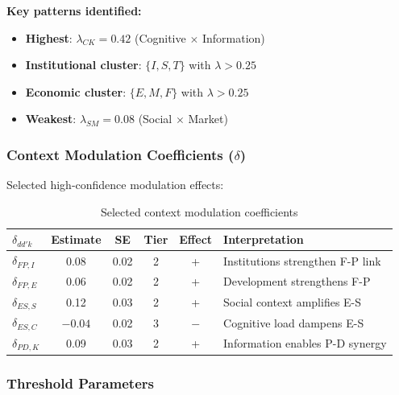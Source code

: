 \textbf{Key patterns identified:}
\begin{itemize}
    \item \textbf{Highest}: $\lambda_{CK} = 0.42$ (Cognitive $\times$ Information)
    \item \textbf{Institutional cluster}: $\{I, S, T\}$ with $\lambda > 0.25$
    \item \textbf{Economic cluster}: $\{E, M, F\}$ with $\lambda > 0.25$
    \item \textbf{Weakest}: $\lambda_{SM} = 0.08$ (Social $\times$ Market)
\end{itemize}

\subsubsection{Context Modulation Coefficients ($\delta$)}

Selected high-confidence modulation effects:

\begin{table}[h]
\centering
\small
\begin{tabular}{lccccl}
\toprule
\textbf{$\delta_{dd'k}$} & \textbf{Estimate} & \textbf{SE} & \textbf{Tier} & \textbf{Effect} & \textbf{Interpretation} \\
\midrule
$\delta_{FP,I}$ & 0.08 & 0.02 & 2 & + & Institutions strengthen F-P link \\
$\delta_{FP,E}$ & 0.06 & 0.02 & 2 & + & Development strengthens F-P \\
$\delta_{ES,S}$ & 0.12 & 0.03 & 2 & + & Social context amplifies E-S \\
$\delta_{ES,C}$ & $-0.04$ & 0.02 & 3 & $-$ & Cognitive load dampens E-S \\
$\delta_{PD,K}$ & 0.09 & 0.03 & 2 & + & Information enables P-D synergy \\
\bottomrule
\end{tabular}
\caption{Selected context modulation coefficients}
\label{tab:delta-selected}
\end{table}

\subsubsection{Threshold Parameters}

